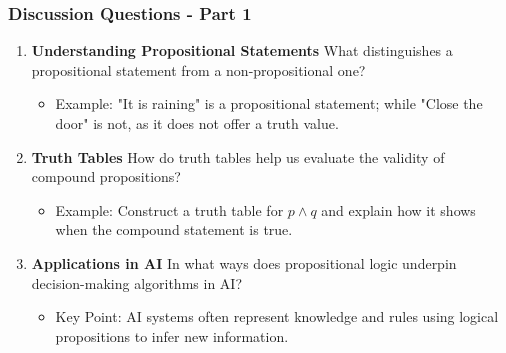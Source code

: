 \documentclass[aspectratio=169]{beamer}
\begin{document}
\begin{frame}[fragile]
    \frametitle{Discussion Questions - Part 1}
    \begin{enumerate}
        \item \textbf{Understanding Propositional Statements}  
              What distinguishes a propositional statement from a non-propositional one?  
              \begin{itemize}
                  \item Example: "It is raining" is a propositional statement; while "Close the door" is not, as it does not offer a truth value.
              \end{itemize}
        
        \item \textbf{Truth Tables}  
              How do truth tables help us evaluate the validity of compound propositions?  
              \begin{itemize}
                  \item Example: Construct a truth table for \( p \land q \) and explain how it shows when the compound statement is true.
              \end{itemize}
        
        \item \textbf{Applications in AI}  
              In what ways does propositional logic underpin decision-making algorithms in AI?  
              \begin{itemize}
                  \item Key Point: AI systems often represent knowledge and rules using logical propositions to infer new information.
              \end{itemize}
    \end{enumerate}
\end{frame}
\end{document}

